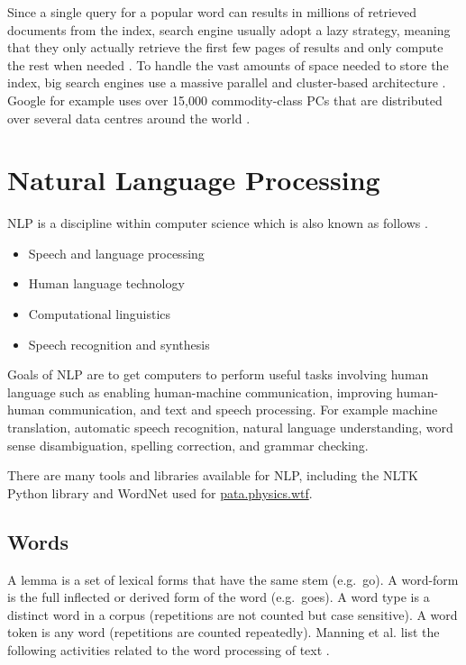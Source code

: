Since a single query for a popular word can results in millions of retrieved documents from the index, search engine usually adopt a lazy strategy, meaning that they only actually retrieve the first few pages of results and only compute the rest when needed \autocite[p.459]{Baeza-Yates2011}. To handle the vast amounts of space needed to store the index, big search engines use a massive parallel and cluster-based architecture \autocite[p.459]{Baeza-Yates2011}. Google for example uses over 15,000 commodity-class PCs that are distributed over several data centres around the world \autocite{Dean2003}.


\section{Natural Language Processing}
\label{s:nlp}

\ac{NLP} is a discipline within computer science which is also known as follows \autocite{Jurafsky2009}.

\begin{itemize}
  \item Speech and language processing
  \item Human language technology
  \item Computational linguistics
  \item Speech recognition and synthesis
\end{itemize}

Goals of \ac{NLP} are to get computers to perform useful tasks involving human language such as enabling human-machine communication, improving human-human communication, and text and speech processing. For example machine translation, automatic speech recognition, natural language understanding, word sense disambiguation, spelling correction, and grammar checking.

There are many tools and libraries available for \ac{NLP}, including the \ac{NLTK} Python library \autocite{Bird2009, NLTK2016} and WordNet \autocite{Princeton2010} used for \url{pata.physics.wtf}.


\subsection{Words}

A lemma is a set of lexical forms that have the same stem (e.g.\ go). A word-form is the full inflected or derived form of the word (e.g.\ goes). A word type is a distinct word in a corpus (repetitions are not counted but case sensitive). A word token is any word (repetitions are counted repeatedly). Manning et al. list the following activities related to the word processing of text \autocite{Manning2009}.

